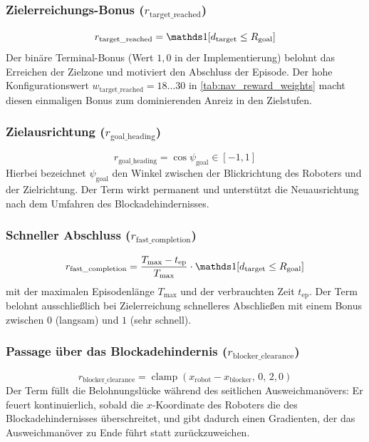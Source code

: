 \subsubsection{Zielerreichungs-Bonus ($r_{\text{target\_reached}}$)}
\begin{equation}\label{eq:nav_target_reached}
r_{\text{target\_reached}} = \ind\!\left[d_{\text{target}} \le R_{\text{goal}}\right]
\end{equation}
Der binäre Terminal-Bonus (Wert $1{,}0$ in der Implementierung) belohnt das Erreichen der Zielzone und motiviert den Abschluss der Episode. Der hohe Konfigurationswert $w_{\text{target\_reached}}=18\dots 30$ in \autoref{tab:nav_reward_weights} macht diesen einmaligen Bonus zum dominierenden Anreiz in den Zielstufen.

\subsubsection{Zielausrichtung ($r_{\text{goal\_heading}}$)}
\begin{equation}\label{eq:nav_goal_heading}
r_{\text{goal\_heading}} = \cos\psi_{\text{goal}} \in [-1,1]
\end{equation}
Hierbei bezeichnet $\psi_{\text{goal}}$ den Winkel zwischen der Blickrichtung des Roboters und der Zielrichtung. Der Term wirkt permanent und unterstützt die Neuausrichtung nach dem Umfahren des Blockadehindernisses.

\subsubsection{Schneller Abschluss ($r_{\text{fast\_completion}}$)}
\begin{equation}\label{eq:nav_fast_completion}
r_{\text{fast\_completion}} = \frac{T_{\max} - t_{\text{ep}}}{T_{\max}}\cdot \ind[d_{\text{target}} \le R_{\text{goal}}]
\end{equation}
mit der maximalen Episodenlänge $T_{\max}$ und der verbrauchten Zeit $t_{\text{ep}}$. Der Term belohnt ausschließlich bei Zielerreichung schnelleres Abschließen mit einem Bonus zwischen $0$ (langsam) und $1$ (sehr schnell).

\subsubsection{Passage über das Blockadehindernis ($r_{\text{blocker\_clearance}}$)}
\begin{equation}\label{eq:nav_blocker_clearance}
r_{\text{blocker\_clearance}} = \operatorname{clamp}\!\left(x_{\text{robot}} - x_{\text{blocker}},\, 0,\, 2{,}0\right)
\end{equation}
Der Term füllt die Belohnungslücke während des seitlichen Ausweichmanövers: Er feuert kontinuierlich, sobald die $x$-Koordinate des Roboters die des Blockadehindernisses überschreitet, und gibt dadurch einen Gradienten, der das Ausweichmanöver zu Ende führt statt zurückzuweichen.

